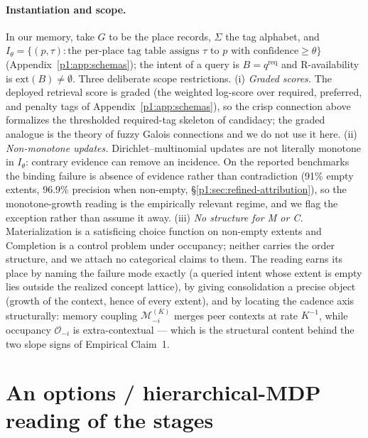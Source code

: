 \documentclass{article}
\begin{document}
\paragraph{Instantiation and scope.}
In our memory, take $G$ to be the place records, $\Sigma$ the tag alphabet, and $I_\theta = \{(p,\tau) : \text{the per-place tag table assigns } \tau \text{ to } p \text{ with confidence} \ge \theta\}$ (Appendix~\ref{p1:app:schemas}); the intent of a query is $B = q^{\mathrm{req}}$ and R-availability is $\mathrm{ext}(B) \ne \emptyset$. Three deliberate scope restrictions. (i) \emph{Graded scores.} The deployed retrieval score is graded (the weighted log-score over required, preferred, and penalty tags of Appendix~\ref{p1:app:schemas}), so the crisp connection above formalizes the thresholded required-tag skeleton of candidacy; the graded analogue is the theory of fuzzy Galois connections \citep{belohlavek1999fuzzy} and we do not use it here. (ii) \emph{Non-monotone updates.} Dirichlet--multinomial updates are not literally monotone in $I_\theta$: contrary evidence can remove an incidence. On the reported benchmarks the binding failure is absence of evidence rather than contradiction (91\% empty extents, 96.9\% precision when non-empty, \S\ref{p1:sec:refined-attribution}), so the monotone-growth reading is the empirically relevant regime, and we flag the exception rather than assume it away. (iii) \emph{No structure for M or C.} Materialization is a satisficing choice function on non-empty extents and Completion is a control problem under occupancy; neither carries the order structure, and we attach no categorical claims to them. The reading earns its place by naming the failure mode exactly (a queried intent whose extent is empty lies outside the realized concept lattice), by giving consolidation a precise object (growth of the context, hence of every extent), and by locating the cadence axis structurally: memory coupling $\mathcal{M}^{(K)}_{-i}$ merges peer contexts at rate $K^{-1}$, while occupancy $\mathcal{O}_{-i}$ is extra-contextual --- which is the structural content behind the two slope signs of Empirical Claim~1.

\section{An options / hierarchical-MDP reading of the stages}
\label{p1:app:hmdp}
\end{document}
